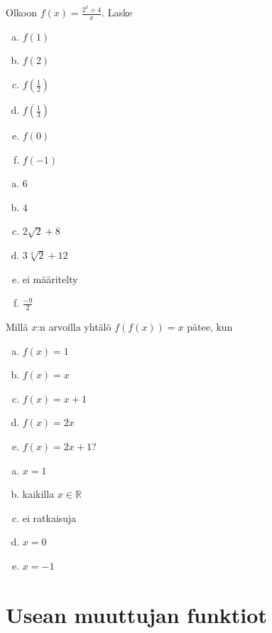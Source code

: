 \begin{tehtava}
Olkoon $f(x)=\frac{2^x+4}{x}$. Laske
\begin{enumerate}[a)]
\item $f(1)$
\item $f(2)$
\item $f(\frac{1}{2})$
\item $f(\frac{1}{3})$
\item $f(0)$
\item $f(-1)$
\end{enumerate}
\begin{vastaus}
\begin{enumerate}[a)]
\item $6$
\item $4$
\item $2\sqrt{2}+8$
\item $3\sqrt[3]{2}+12$
\item ei määritelty
\item $\frac{-9}{2}$
\end{enumerate}
\end{vastaus}
\end{tehtava}

\begin{tehtava}
Millä $x$:n arvoilla yhtälö $f(f(x)) = x$ pätee, kun
\begin{enumerate}[a)]
\item $f(x) = 1$
\item $f(x) = x$
\item $f(x) = x+1$
\item $f(x) = 2x$
\item $f(x) = 2x+1$?
\end{enumerate}
\begin{vastaus}
\begin{enumerate}[a)]
\item $x = 1$
\item kaikilla $x\in\mathbb{R}$
\item ei ratkaisuja
\item $x = 0$
\item $x = -1$
\end{enumerate}
\end{vastaus}
\end{tehtava}


\section{Usean muuttujan funktiot}

